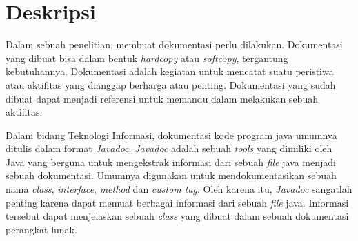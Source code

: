 \documentclass[a4paper,twoside]{article}
\begin{document}
\title{\@judultopik}
\author{\nama \textendash \@npm} 

\newcommand{\nama}{Adli Fariz Bonaputra}
\newcommand{\@npm}{2012730082}
\newcommand{\@judultopik}{Konversi Javadoc ke \LaTeX} %
\newcommand{\jumpemb}{1} %
\newcommand{\tanggal}{30/08/2017}
\maketitle


\section{Deskripsi}
Dalam sebuah penelitian, membuat dokumentasi perlu dilakukan. Dokumentasi yang dibuat bisa dalam bentuk {\it hardcopy} atau {\it softcopy}, tergantung kebutuhannya. Dokumentasi adalah kegiatan untuk mencatat suatu peristiwa atau aktifitas yang dianggap berharga atau penting. Dokumentasi yang sudah dibuat dapat menjadi referensi untuk memandu dalam melakukan sebuah aktifitas.

Dalam bidang Teknologi Informasi, dokumentasi kode program java umumnya ditulis dalam format {\it Javadoc}. {\it Javadoc} adalah sebuah {\it tools} yang dimiliki oleh Java yang berguna untuk mengekstrak informasi dari sebuah {\it file} java menjadi sebuah dokumentasi. Umumnya digunakan untuk mendokumentasikan sebuah nama {\it class}, {\it interface}, {\it method} dan {\it custom tag}. Oleh karena itu, {\it Javadoc} sangatlah penting karena dapat memuat berbagai informasi dari sebuah {\it file} java. Informasi tersebut dapat menjelaskan sebuah {\it class} yang dibuat dalam sebuah dokumentasi perangkat lunak. %
\end{document}
